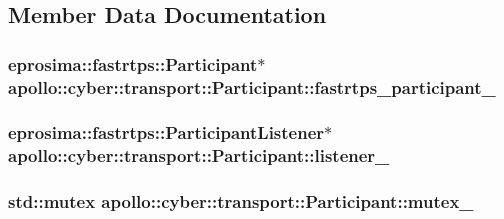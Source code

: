 \subsection{Member Data Documentation}
\hypertarget{classapollo_1_1cyber_1_1transport_1_1Participant_a5c915b44cfcdcdb1f119d32dbd09fe09}{
\subsubsection[{fastrtps\-\_\-participant\-\_\-}]{\setlength{\rightskip}{0pt plus 5cm}eprosima\-::fastrtps\-::\-Participant$\ast$ apollo\-::cyber\-::transport\-::\-Participant\-::fastrtps\-\_\-participant\-\_\-\hspace{0.3cm}{\ttfamily [private]}}}\label{classapollo_1_1cyber_1_1transport_1_1Participant_a5c915b44cfcdcdb1f119d32dbd09fe09}
\hypertarget{classapollo_1_1cyber_1_1transport_1_1Participant_a3d54979f405234c2951247230db1c179}{
\subsubsection[{listener\-\_\-}]{\setlength{\rightskip}{0pt plus 5cm}eprosima\-::fastrtps\-::\-Participant\-Listener$\ast$ apollo\-::cyber\-::transport\-::\-Participant\-::listener\-\_\-\hspace{0.3cm}{\ttfamily [private]}}}\label{classapollo_1_1cyber_1_1transport_1_1Participant_a3d54979f405234c2951247230db1c179}
\hypertarget{classapollo_1_1cyber_1_1transport_1_1Participant_af1722d7b981059db589b92ac6f128665}{
\subsubsection[{mutex\-\_\-}]{\setlength{\rightskip}{0pt plus 5cm}std\-::mutex apollo\-::cyber\-::transport\-::\-Participant\-::mutex\-\_\-\hspace{0.3cm}{\ttfamily [private]}}}\label{classapollo_1_1cyber_1_1transport_1_1Participant_af1722d7b981059db589b92ac6f128665}
